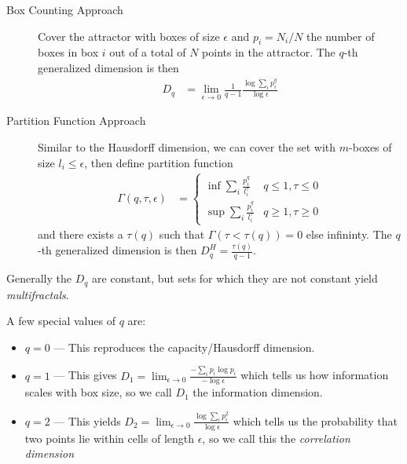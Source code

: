 \documentclass[10pt]{article}
\begin{document}
\begin{description}
    \item[Box Counting Approach] Cover the attractor with boxes of size
        $\epsilon$ and $p_i = N_i/N$ the number of boxes in box $i$ out of a
        total of $N$ points in the attractor. The $q$-th generalized dimension
        is then
        \begin{align}
            D_q &= \lim_{\epsilon \to 0}
            \frac{1}{q-1}\frac{\log \sum\limits_{i}^{}p_i^q}{\log \epsilon}
        \end{align}

    \item[Partition Function Approach] Similar to the Hausdorff dimension, we
        can cover the set with $m$-boxes of size $l_i \leq \epsilon$, then
        define partition function
        \begin{align}
            \Gamma(q,\tau,\epsilon) &=
            \begin{cases}
                \inf \sum\limits_{i}^{}\frac{p_i^q}{l_i^\tau} &
                    q \leq 1, \tau \leq 0 \\
                \sup \sum\limits_{i}^{} \frac{p_i^q}{l_i^\tau} &
                    q \geq 1, \tau \geq 0
            \end{cases}
        \end{align}
        and there exists a $\tau(q)$ such that $\Gamma(\tau < \tau(q)) = 0$ else
        infininty. The $q$-th generalized dimension is then
        $D_q^H = \frac{\tau(q)}{q-1}$.
\end{description}

Generally the $D_q$ are constant, but sets for which they are not constant yield
\emph{multifractals}.

A few special values of $q$ are:
\begin{itemize}
    \item $q=0$ --- This reproduces the capacity/Hausdorff dimension.
    \item $q=1$ --- This gives
        $D_1 = \lim_{\epsilon \to 0} \frac{-\sum\limits_{i}^{}p_i \log p_i}
        {-\log \epsilon}$
        which tells us how information scales with box size, so we call $D_1$
        the information dimension.
    \item $q=2$ --- This yields
        $D_2 = \lim_{\epsilon \to 0}
        \frac{\log \sum\limits_{i}^{}p_i^2}{\log \epsilon}$
        which tells us the probability that two points lie within cells of
        length $\epsilon$, so we call this the \emph{correlation dimension}
\end{itemize}
\end{document}
